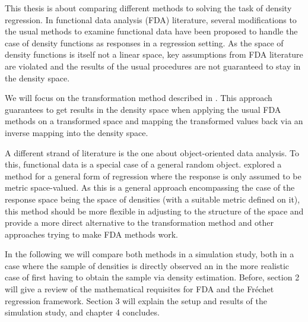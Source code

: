 This thesis is about comparing different methods to solving the task of density
regression. In functional data analysis (FDA) literature, several modifications to
the usual methods to examine functional data have been proposed to handle the case of
density functions as responses in a regression setting. As the space of density functions is itself
not a linear space, key assumptions from FDA literature are violated and the results
of the usual procedures are not guaranteed to stay in the density space.

We will focus on the transformation method described in \textcite{PetersenMüller2016}.
This approach guarantees to get results in the density space when applying the usual
FDA methods on a transformed space and mapping the transformed values back via an
inverse mapping into the density space.

A different strand of literature is the one about object-oriented data analysis. To this,
functional data is a special case of a general random object. \textcite{PetersenMüller2019}
explored a method for a general form of regression where the response is only assumed to
be metric space-valued. As this is a general approach encompassing the case of the
response space being the space of densities (with a suitable metric defined on it),
this method should be more flexible in adjusting to the structure of the space and
provide a more direct alternative to the transformation method and other approaches
trying to make FDA methods work.

In the following we will compare both methods in a simulation study, both in a case
where the sample of densities is directly observed an in the more realistic case of
first having to obtain the sample via density estimation. Before, section 2 will give
a review of the mathematical requisites for FDA and the Fréchet regression framework.
Section 3 will explain the setup and results of the simulation study, and chapter 4
concludes.